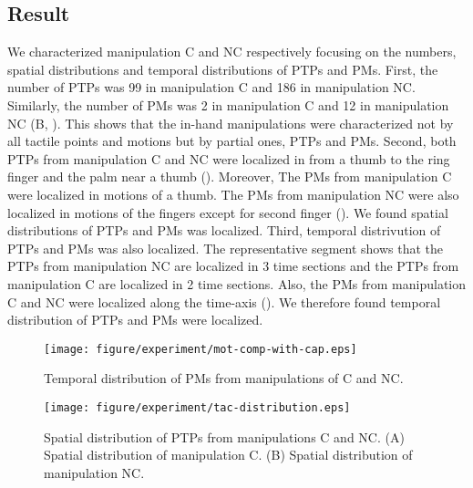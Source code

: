 \documentclass[letterpaper, 10 pt, conference]{IEEEtran}  %
\begin{document}
\subsection{Result}
We characterized manipulation C and NC respectively focusing on the numbers, spatial distributions and temporal distributions of PTPs and PMs. First, the number of PTPs was 99 in manipulation C and 186 in manipulation NC. Similarly, the number of PMs was 2 in manipulation C and 12 in manipulation NC (B, ). This shows that the in-hand manipulations were characterized not by all tactile points and motions but by partial ones, PTPs and PMs. Second, both PTPs from manipulation C and NC were localized in from a thumb to the ring finger and the palm near a thumb (). Moreover, The PMs from manipulation C were localized in motions of a thumb. The PMs from manipulation NC were also localized in motions of the fingers except for second finger (). We found spatial distributions of PTPs and PMs was localized. Third, temporal distrivution of PTPs and PMs was also localized. The representative segment shows that the PTPs from manipulation NC are localized in 3 time sections and the PTPs from manipulation C are localized in 2 time sections. Also, the PMs from manipulation C and NC were localized along the time-axis (). We therefore found temporal distribution of PTPs and PMs were localized.

\begin{figure}[t!]
 \centering
  \texttt{[image: figure/experiment/mot-comp-with-cap.eps]} %
 \caption{Temporal distribution of PMs from manipulations of C and NC.}
 \label{fig:comp-mot}
\end{figure}


\begin{figure}[t!]
 \centering
  \texttt{[image: figure/experiment/tac-distribution.eps]}
  \caption{Spatial distribution of PTPs from manipulations C and NC. (A) Spatial distribution of manipulation C. (B) Spatial distribution of manipulation NC.}
 \label{fig:tac-dist}
\end{figure}
\end{document}
